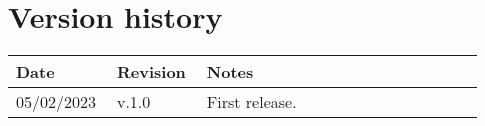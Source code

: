 \chapter*{Version history}

\begin{center}
	\begin{tabular}{@{}p{0.18\linewidth} p{0.18\linewidth} p{0.57\linewidth}@{}}
		\toprule
		\textbf{Date} & \textbf{Revision} & \textbf{Notes}\\
		\midrule
		05/02/2023 & v.1.0 & First release.\\
		\bottomrule
	\end{tabular}
\end{center}